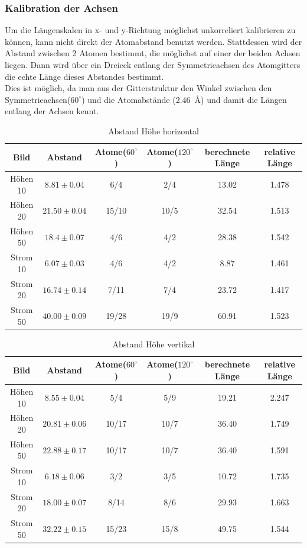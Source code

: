 \documentclass[12pt,a4paper]{article}
\begin{document}
\subsubsection{Kalibration der Achsen}
Um die Längenskalen in x- und y-Richtung möglichst unkorreliert kalibrieren zu können, kann nicht direkt der Atomabstand benutzt werden. Stattdessen wird der Abstand zwischen 2 Atomen bestimmt, die möglichst auf einer der beiden Achsen liegen. Dann wird über ein Dreieck entlang der Symmetrieachsen des Atomgitters die echte Länge dieses Abstandes bestimmt.\\
Dies ist möglich, da man aus der Gitterstruktur den Winkel zwischen den Symmetrieachsen($60^{\circ}$) und die Atomabstände (\SI{2.46}{\angstrom}) und damit die Längen entlang der Achsen kennt.

\begin{table}
\begin{tabular}{|c|c||c|c||c|c|}
\hline 
Bild & Abstand & Atome($60^{\circ}$) & Atome($120^{\circ}$) & berechnete Länge & relative Länge\\ 
\hline 
\hline 
Höhen 10 & $8.81\pm 0.04$ & 6/4 & 2/4 & 13.02& 1.478 \\ 
\hline 
Höhen 20 & $21.50\pm 0.04$ & 15/10 & 10/5 & 32.54& 1.513\\ 
\hline 
Höhen 50 & $18.4\pm 0.07$ & 4/6  & 4/2 & 28.38& 1.542\\ 
\hline 
\hline
Strom 10 & $6.07\pm 0.03$ & 4/6 & 4/2 & 8.87& 1.461\\ 
\hline 
Strom 20 & $16.74\pm 0.14$ & 7/11  & 7/4 & 23.72& 1.417\\ 
\hline 
Strom 50 & $40.00\pm 0.09$ & 19/28  & 19/9 & 60.91& 1.523\\ 
\hline 
\end{tabular} 
\caption{Abstand Höhe horizontal}
\label{tab:Atome_horizontal}
\end{table}

\begin{table}
\begin{tabular}{|c|c||c|c||c|c|}
\hline 
Bild & Abstand & Atome($60^{\circ}$) & Atome($120^{\circ}$) & berechnete Länge & relative Länge\\ 
\hline 
\hline 
Höhen 10 & $8.55\pm 0.04$ & 5/4 & 5/9 & 19.21& 2.247\\ 
\hline 
Höhen 20 & $20.81\pm 0.06$ & 10/17  & 10/7 & 36.40& 1.749\\ 
\hline 
Höhen 50 & $22.88\pm 0.17$ & 10/17  & 10/7 & 36.40& 1.591\\ 
\hline 
\hline 
Strom 10 & $6.18\pm 0.06$ & 3/2 & 3/5 & 10.72& 1.735\\ 
\hline 
Strom 20 & $18.00\pm 0.07$ & 8/14  & 8/6 & 29.93& 1.663\\ 
\hline 
Strom 50 & $32.22\pm 0.15$ & 15/23  & 15/8 & 49.75& 1.544\\ 
\hline 
\end{tabular} 
\caption{Abstand Höhe vertikal}
\label{tab:Atome_vertikal}
\end{table}
\end{document}
